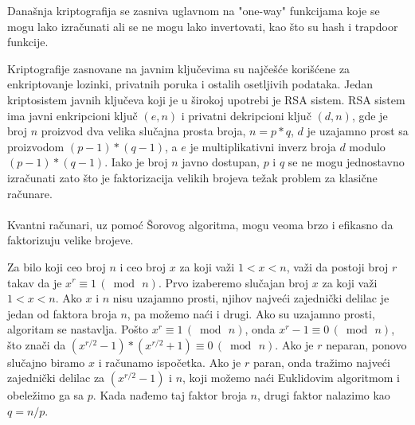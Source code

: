 \documentclass[fleqn, 12pt]{article}
\begin{document}
\begin{text}
Današnja kriptografija se zasniva uglavnom na "one-way" funkcijama koje se mogu lako izračunati ali se ne mogu lako invertovati, kao što su hash i trapdoor funkcije. \cite{G5} 

Kriptografije zasnovane na javnim ključevima su najčešće korišćene za enkriptovanje lozinki, privatnih poruka i ostalih osetljivih podataka. Jedan kriptosistem javnih ključeva koji je u širokoj upotrebi je RSA sistem. RSA sistem ima javni enkripcioni ključ \((e,n)\) i privatni dekripcioni ključ \((d,n)\), gde je broj \(n\) proizvod dva velika slučajna prosta broja, \(n = p * q\), \(d\) je uzajamno prost sa proizvodom \((p - 1) * (q - 1)\), a \(e\) je multiplikativni inverz broja \(d\) modulo \((p - 1) * (q - 1)\). Iako je broj \(n\) javno dostupan, \(p\) i \(q\) se ne mogu jednostavno izračunati zato što je faktorizacija velikih brojeva težak problem za klasične računare. \cite{G3}
\\\\

Kvantni računari, uz pomoć Šorovog algoritma, mogu veoma brzo i efikasno da faktorizuju velike brojeve. \cite{G4}

Za bilo koji ceo broj \(n\) i ceo broj \(x\) za koji važi \(1 < x < n\), važi da postoji broj \(r\) takav da je \(x^r \equiv 1\, ( \bmod\, n)\). Prvo izaberemo slučajan broj \(x\) za koji važi \(1 < x < n\). Ako \(x\) i \(n\) nisu uzajamno prosti, njihov najveći zajednički delilac je jedan od faktora broja \(n\), pa možemo naći i drugi. Ako su uzajamno prosti, algoritam se nastavlja.
Pošto  \(x^r \equiv 1\, ( \bmod\, n)\), onda \(x^r - 1 \equiv 0\, ( \bmod\, n)\), što znači da \((x^{r/2} - 1)*(x^{r/2} + 1) \equiv 0\, ( \bmod\, n)\). Ako je \(r\) neparan, ponovo slučajno biramo \(x\) i računamo ispočetka. Ako je \(r\) paran, onda tražimo najveći zajednički delilac za \((x^{r/2} - 1)\) i \(n\), koji možemo naći Euklidovim algoritmom i obeležimo ga sa \(p\).
Kada nađemo taj faktor broja \(n\), drugi faktor nalazimo kao \(q = n/p\). \cite{G4}

\end{text}

\newpage
\end{document}
